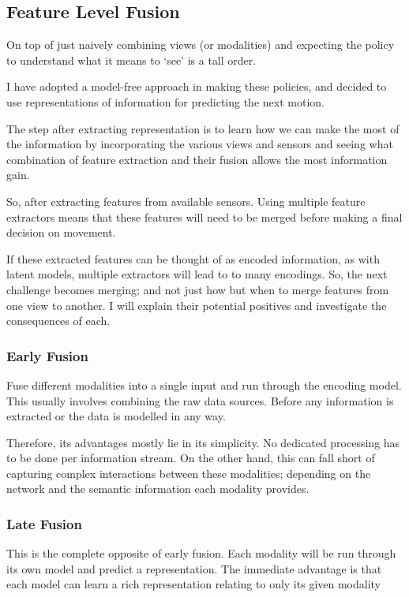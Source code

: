 \subsection{Feature Level Fusion}
On top of just naively combining views (or modalities) and expecting the policy to understand what it means to `see' is a tall order. 

I have adopted a model-free approach in making these policies, and decided to use representations of information for predicting the next motion.

The step after extracting representation is to learn how we can make the most of the information by incorporating the various views and sensors and seeing what combination of feature extraction and their fusion allows the most information gain.

So, after extracting features from available sensors. Using multiple feature extractors means that these features will need to be merged before making a final decision on movement.

If these extracted features can be thought of as encoded information, as with latent models, multiple extractors will lead to to many encodings. So, the next challenge becomes merging; and not just how but when to merge features from one view to another. I will explain their potential positives and investigate the consequences of each.

\subsubsection{Early Fusion}
Fuse different modalities into a single input and run through the encoding model. This usually involves combining the raw data sources. Before any information is extracted or the data is modelled in any way.

Therefore, its advantages mostly lie in its simplicity. No dedicated processing has to be done per information stream. On the other hand, this can fall short of capturing complex interactions between these modalities; depending on the network and the semantic information each modality provides.

\subsubsection{Late Fusion}
This is the complete opposite of early fusion. Each modality will be run through its own model and predict a representation. The immediate advantage is that each model can learn a rich representation relating to only its given modality


